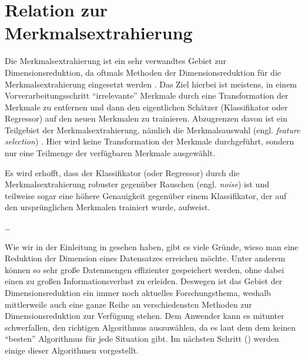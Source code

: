 \section{Relation zur Merkmalsextrahierung}
\label{ch:Dimensionsreduktion:Merkmalsextrahierung}

Die Merkmalsextrahierung ist ein sehr verwandtes Gebiet zur Dimensionsreduktion, da oftmals
Methoden der Dimensionsreduktion für die Merkmalsextrahierung eingesetzt werden \parencite[3]{Guyon.2006b}. Das Ziel hierbei ist meistens, in einem Vorverarbeitungsschritt
\enquote{irrelevante} Merkmale durch eine Transformation der Merkmale zu entfernen und dann den
eigentlichen Schätzer (Klassifikator oder Regressor) auf den neuen Merkmalen zu trainieren.
Abzugrenzen davon ist ein Teilgebiet der Merkmalsextrahierung, nämlich die Merkmalsauswahl (engl.
\textit{feature selection}) \parencite{Blum.1997}. Hier wird keine Transformation der Merkmale durchgeführt, sondern nur eine
Teilmenge der verfügbaren Merkmale ausgewählt.

Es wird erhofft, dass der Klassifikator (oder Regressor) durch die Merkmalsextrahierung robuster
gegenüber Rauschen (engl. \textit{noise}) ist und teilweise sogar eine höhere Genauigkeit gegenüber
einem Klassifikator, der auf den ursprünglichen Merkmalen trainiert wurde, aufweist.

\ldots

Wie wir in der Einleitung in  gesehen haben, gibt es viele Gründe, wieso man
eine Reduktion der Dimension eines Datensatzes erreichen möchte. Unter anderem können so sehr große
Datenmengen effizienter gespeichert werden, ohne dabei einen zu großen Informationsverlust zu
erleiden. Deswegen ist das Gebiet der Dimensionsreduktion ein immer noch aktuelles Forschungsthema,
weshalb mittlerweile auch eine ganze Reihe an verschiedensten Methoden zur Dimensionsreduktion zur
Verfügung stehen. Dem Anwender kann es mitunter schwerfallen, den richtigen Algorithmus
auszuwählen, da es laut dem dem  \parencite{Wolpert.1997} keinen \enquote{besten} Algorithmus für jede Situation gibt. Im nächsten
Schritt () werden einige dieser Algorithmen vorgestellt.